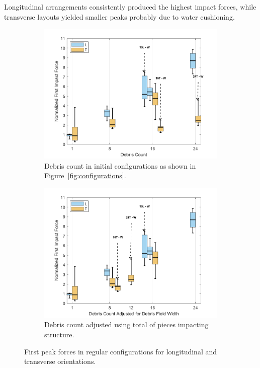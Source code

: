 \documentclass{article}
\begin{document}
{Longitudinal arrangements consistently produced the highest impact forces, while transverse layouts yielded smaller peaks probably due to water cushioning.

\begin{figure}[htbp]
    \centering
    \begin{subfigure}[t]{0.9\textwidth}
        \centering
        \includegraphics[width=\textwidth]{FirstPeak_Regular_SplitByTrial.png}
        \caption{Debris count in initial configurations as shown in Figure~\ref{fig:configurations}.}
        \label{fig:firstpeak_regular_original}
    \end{subfigure}
    \hfill
    \begin{subfigure}[t]{0.9\textwidth}
        \centering
        \includegraphics[width=\textwidth]{FirstPeak_Regular_RemappedT.png}
        \caption{Debris count adjusted using total of pieces impacting structure.}
        \label{fig:firstpeak_regular_remap}
    \end{subfigure}
    \caption{First peak forces in regular configurations for longitudinal and transverse orientations.}
    \label{fig:firstpeak_regular_split}
\end{figure}

}
\end{document}
